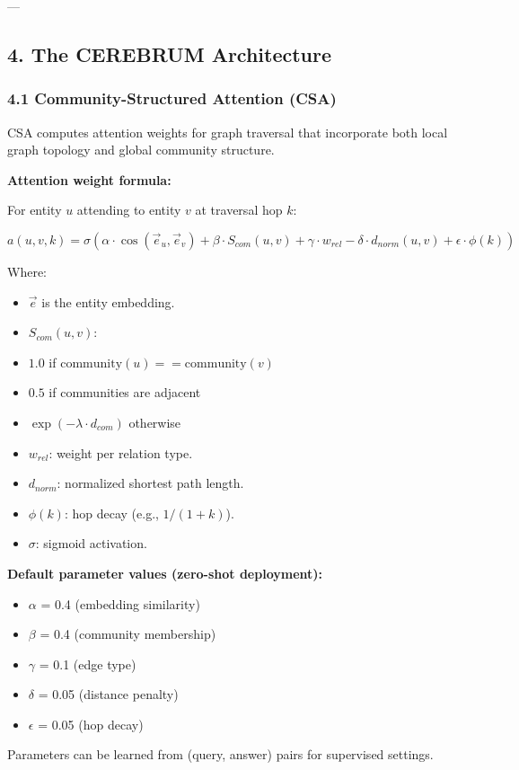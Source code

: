 \documentclass[10pt,journal,compsoc]{IEEEtran}
\begin{document}
---

\subsection{4. The CEREBRUM Archit\-ecture}

\subsubsection{4.1 Community-Structured Attention (CSA)}

CSA computes attention weights for graph traversal that incorporate both local graph topology and global community structure.

\textbf{Attention weight formula:}

For entity $u$ attending to entity $v$ at traversal hop $k$:

\begin{equation}
a(u, v, k) = \sigma\left( \alpha \cdot \cos(\vec{e}_u, \vec{e}_v) + \beta \cdot S_{com}(u, v) + \gamma \cdot w_{rel} - \delta \cdot d_{norm}(u, v) + \epsilon \cdot \phi(k) \right)
\end{equation}

Where:
\begin{itemize}
\item $\vec{e}$ is the entity embedding.
\item $S_{com}(u, v)$:
\item $1.0$ if $\text{community}(u) == \text{community}(v)$
\item $0.5$ if communities are adjacent
\item $\exp(-\lambda \cdot d_{com})$ otherwise
\item $w_{rel}$: weight per relation type.
\item $d_{norm}$: normalized shortest path length.
\item $\phi(k)$: hop decay (e.g., $1 / (1 + k)$).
\item $\sigma$: sigmoid activation.


\end{itemize}
\textbf{Default parameter values (zero-shot deployment):}
\begin{itemize}
\item $\alpha$ = 0.4 (embedding similarity)
\item $\beta$ = 0.4 (community membership)
\item $\gamma$ = 0.1 (edge type)
\item $\delta$ = 0.05 (distance penalty)
\item $\epsilon$ = 0.05 (hop decay)

\end{itemize}
Parameters can be learned from (query, answer) pairs for supervised settings.
\end{document}

